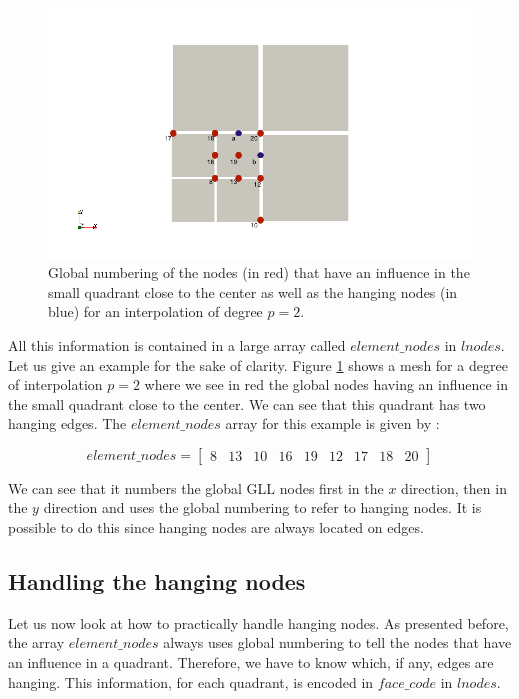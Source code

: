 \begin{figure}
\centering
\includegraphics[scale=0.5]{Implementation/nodes_ex.png}
\caption{Global numbering of the nodes (in red) that have an influence in the small quadrant close to the center as well as the hanging nodes (in blue) for an interpolation of degree $p=2$. }
\label{nodes_ex}
\end{figure}

All this information is contained in a large array called $element\_nodes$ in $lnodes$. Let us give an example for the sake of clarity. Figure \ref{nodes_ex} shows a mesh for a degree of interpolation $p=2$ where we see in red the global nodes having an influence in the small quadrant close to the center. We can see that this quadrant has two hanging edges. The $element\_nodes$ array for this example is given by : 

$$element\_nodes = \begin{bmatrix}
8 &13& 10& 16 &19& 12 &17& 18& 20
\end{bmatrix}$$

We can see that it numbers the global GLL nodes first in the $x$ direction, then in the $y$ direction and uses the global numbering to refer to hanging nodes. It is possible to do this since hanging nodes are always located on edges. 

\subsection{Handling the hanging nodes}

Let us now look at how to practically handle hanging nodes. As presented before, the array $element\_nodes$ always uses global numbering to tell the nodes that have an influence in a quadrant. Therefore, we have to know which, if any, edges are hanging. This information, for each quadrant, is encoded in $face\_code$ in $lnodes$.

